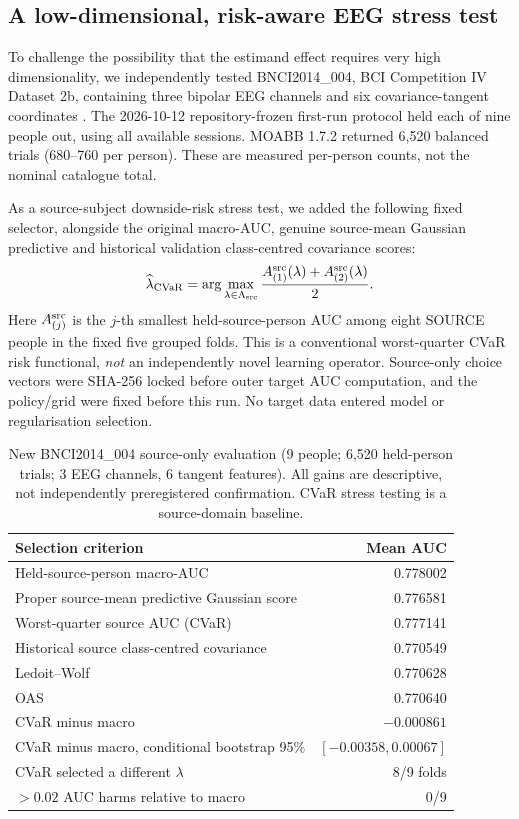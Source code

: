 \subsection{A low-dimensional, risk-aware EEG stress test}
\label{sec:v21-lowrank-risk}
To challenge the possibility that the
estimand effect requires very high dimensionality,
we independently tested BNCI2014\_004,
BCI Competition IV Dataset 2b,
containing three bipolar EEG channels
and six covariance-tangent coordinates
\cite{tangermann2012bciiv,jayaram2018moabb}.
The 2026-10-12 repository-frozen first-run
protocol held each of nine people out,
using all available sessions. MOABB 1.7.2
returned 6,520 balanced trials (680--760
per person). These are measured per-person
counts, not the nominal catalogue total.

As a source-subject downside-risk
stress test, we added the following
fixed selector, alongside the original
macro-AUC, genuine source-mean Gaussian
predictive and historical validation
class-centred covariance scores:
\[
\widehat\lambda_{\mathrm{CVaR}}=
\arg\max_{\lambda\in\Lambda_{\rm src}}
\frac{A^{\rm src}_{(1)}(\lambda)+
A^{\rm src}_{(2)}(\lambda)}2 .
\]
Here $A^{\rm src}_{(j)}$ is the
$j$-th smallest held-source-person AUC
among eight SOURCE people in the fixed
five grouped folds. This is a
conventional worst-quarter CVaR
risk functional, \emph{not} an
independently novel learning operator.
Source-only choice vectors were SHA-256
locked before outer target AUC computation,
and the policy/grid were fixed before
this run. No target data entered model
or regularisation selection.

\begin{table}[tb]
\centering\small
\caption{New BNCI2014\_004 source-only
evaluation (9 people; 6,520 held-person
trials; 3 EEG channels, 6 tangent features).
All gains are descriptive, not independently
preregistered confirmation. CVaR stress
testing is a source-domain baseline.}
\label{tab:v21-lowdim-cvar}
\begin{tabular}{lr}
\toprule
Selection criterion & Mean AUC\\
\midrule
Held-source-person macro-AUC & 0.778002\\
Proper source-mean predictive Gaussian score & 0.776581\\
Worst-quarter source AUC (CVaR) & 0.777141\\
Historical source class-centred covariance & 0.770549\\
Ledoit--Wolf & 0.770628\\
OAS & 0.770640\\
\midrule
CVaR minus macro & $-0.000861$\\
CVaR minus macro, conditional bootstrap 95\% &
$[-0.00358,0.00067]$\\
CVaR selected a different $\lambda$ & 8/9 folds\\
$>0.02$ AUC harms relative to macro & 0/9\\
\bottomrule
\end{tabular}
\end{table}

